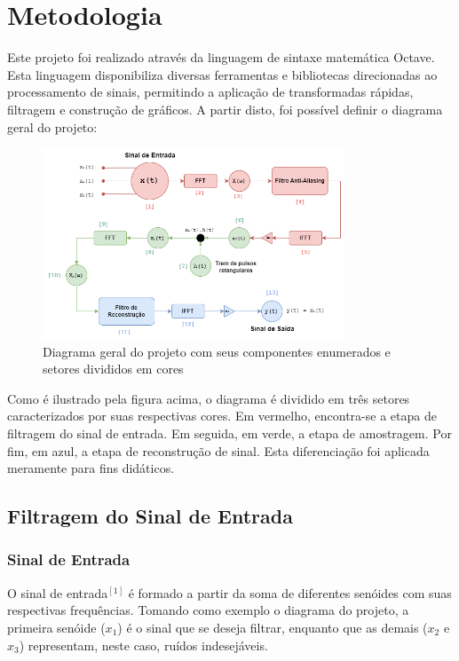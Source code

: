 \documentclass[]{IEEEtran}
\begin{document}
\section{Metodologia}

Este projeto foi realizado através da linguagem de sintaxe matemática Octave. Esta linguagem disponibiliza diversas ferramentas e bibliotecas direcionadas ao processamento de sinais, permitindo a aplicação de transformadas rápidas, filtragem e construção de gráficos. A partir disto, foi possível definir o diagrama geral do projeto:

\begin{figure}[H]
\captionsetup{justification=centering}
\centering %
\includegraphics[width=9cm]{Diagrama_Geral.png} %
\caption{Diagrama geral do projeto com seus componentes enumerados e setores divididos em cores}
\end{figure}

Como é ilustrado pela figura acima, o diagrama é dividido em três setores caracterizados por suas respectivas cores. Em vermelho, encontra-se a etapa de filtragem do sinal de entrada. Em seguida, em verde, a etapa de amostragem. Por fim, em azul, a etapa de reconstrução de sinal. Esta diferenciação foi aplicada meramente para fins didáticos. 

\subsection{Filtragem do Sinal de Entrada}

\subsubsection{Sinal de Entrada}

O sinal de entrada$^{[1]}$ é formado a partir da soma de diferentes senóides com suas respectivas frequências. Tomando como exemplo o diagrama do projeto, a primeira senóide ($x_1$) é o sinal que se deseja filtrar, enquanto que as demais ($x_2$ e $x_3$) representam, neste caso, ruídos indesejáveis. 
\end{document}
